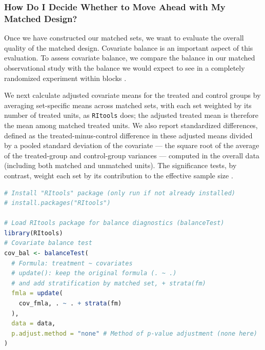 \documentclass[twoside,11pt]{article}
\begin{document}
\subsubsection{How Do I Decide Whether to Move Ahead with My Matched
Design?}\label{how-do-i-decide-whether-to-move-ahead-with-my-matched-design}

Once we have constructed our matched sets, we want to evaluate the
overall quality of the matched design. Covariate balance is an important
aspect of this evaluation. To assess covariate balance, we compare the
balance in our matched observational study with the balance we would
expect to see in a completely randomized experiment within blocks
\citep{hansenbowers2008}.

We next calculate adjusted covariate means for the treated and control
groups by averaging set-specific means across matched sets, with each
set weighted by its number of treated units, as \texttt{RItools} does; the adjusted treated mean is therefore the mean among matched
treated units. We also report standardized differences, defined as the
treated-minus-control difference in these adjusted means divided by a
pooled standard deviation of the covariate --- the square root of the
average of the treated-group and control-group variances --- computed in
the overall data (including both matched and unmatched units). The
significance tests, by contrast, weight each set by its contribution to
the effective sample size \citep{hansenbowers2008}.



\begin{lstlisting}[language=R]
# Install "RItools" package (only run if not already installed)
# install.packages("RItools")

# Load RItools package for balance diagnostics (balanceTest)
library(RItools)
# Covariate balance test
cov_bal <- balanceTest(
  # Formula: treatment ~ covariates
  # update(): keep the original formula (. ~ .)
  # and add stratification by matched set, + strata(fm)
  fmla = update(
    cov_fmla, . ~ . + strata(fm)
  ),
  data = data,
  p.adjust.method = "none" # Method of p-value adjustment (none here)
)
\end{lstlisting}
\end{document}
